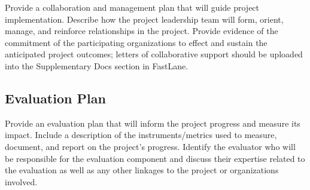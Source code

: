 Provide a collaboration and management plan that will guide project implementation.  Describe how the project leadership team will form, orient, manage, and reinforce relationships in the project.  Provide evidence of the commitment of the participating organizations to effect and sustain the anticipated project outcomes; letters of collaborative support should be uploaded into the Supplementary Docs section in FastLane. 

\subsection*{Evaluation Plan}

Provide an evaluation plan that will inform the project progress and measure its impact.  Include a description of the instruments/metrics used to measure, document, and report on the project's progress.  Identify the evaluator who will be responsible for the evaluation component and discuss their expertise related to the evaluation as well as any other linkages to the project or organizations involved.  







